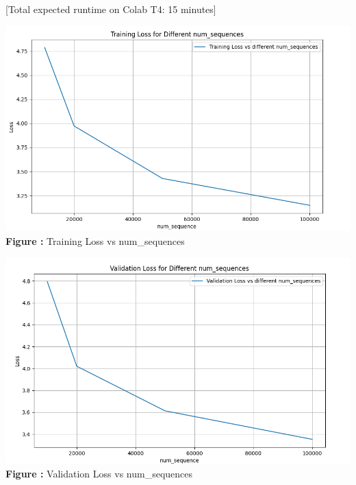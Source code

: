 \documentclass[11pt,addpoints,answers]{exam}
\begin{document}
\begin{questions}
\begin{parts}
    {[}Total expected runtime on Colab T4: 15 minutes{]}
    
    \begin{your_solution}[height=7cm]
	\begin{minipage}{0.48\linewidth}
	\centering
	\includegraphics[width=\linewidth]{../handout/Q5_3_training.png}
	 \\ %
	{\tiny \textbf{Figure \thefigure:} Training Loss vs num\_sequences}  %
	\label{fig:Q5_3_training}         %
	\end{minipage}
	\hfill
	\begin{minipage}{0.48\linewidth}
	\centering
	\includegraphics[width=\linewidth]{../handout/Q5_3_validation.png}
	 \\ %
	{\tiny \textbf{Figure \thefigure:} Validation Loss vs num\_sequences} %
	\label{fig:Q5_3_validation}         %
	\end{minipage}        
    \end{your_solution}




\end{parts}
\end{questions}
\end{document}
